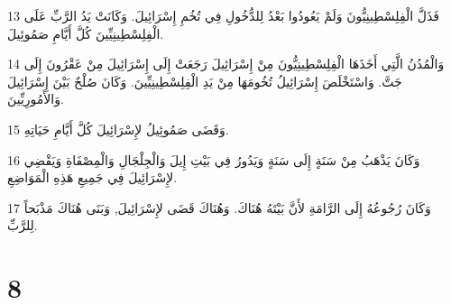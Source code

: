 \par 13 فَذَلَّ الْفِلِسْطِينِيُّونَ وَلَمْ يَعُودُوا بَعْدُ لِلدُّخُولِ فِي تُخُمِ إِسْرَائِيلَ. وَكَانَتْ يَدُ الرَّبِّ عَلَى الْفِلِسْطِينِيِّينَ كُلَّ أَيَّامِ صَمُوئِيلَ.
\par 14 وَالْمُدُنُ الَّتِي أَخَذَهَا الْفِلِسْطِينِيُّونَ مِنْ إِسْرَائِيلَ رَجَعَتْ إِلَى إِسْرَائِيلَ مِنْ عَقْرُونَ إِلَى جَتَّ. وَاسْتَخْلَصَ إِسْرَائِيلُ تُخُومَهَا مِنْ يَدِ الْفِلِسْطِينِيِّينَ. وَكَانَ صُلْحٌ بَيْنَ إِسْرَائِيلَ وَالأَمُورِيِّينَ.
\par 15 وَقَضَى صَمُوئِيلُ لإِسْرَائِيلَ كُلَّ أَيَّامِ حَيَاتِهِ.
\par 16 وَكَانَ يَذْهَبُ مِنْ سَنَةٍ إِلَى سَنَةٍ وَيَدُورُ فِي بَيْتِ إِيلَ وَالْجِلْجَالِ وَالْمِصْفَاةِ وَيَقْضِي لإِسْرَائِيلَ فِي جَمِيعِ هَذِهِ الْمَوَاضِعِ.
\par 17 وَكَانَ رُجُوعُهُ إِلَى الرَّامَةِ لأَنَّ بَيْتَهُ هُنَاكَ. وَهُنَاكَ قَضَى لإِسْرَائِيلَ, وَبَنَى هُنَاكَ مَذْبَحاً لِلرَّبِّ.

\chapter{8}

